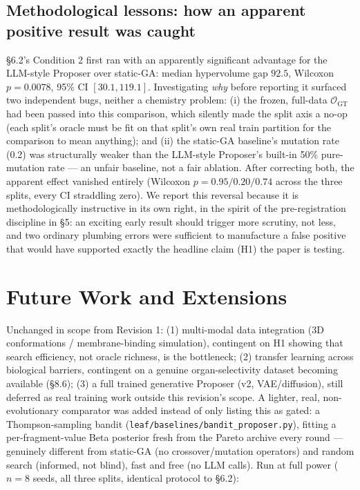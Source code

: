 \documentclass{article}
\begin{document}
\subsection{Methodological lessons: how an apparent positive result was
caught}

\S6.2's Condition 2 first ran with an apparently significant advantage for
the LLM-style Proposer over static-GA: median hypervolume gap $92.5$,
Wilcoxon $p=0.0078$, 95\% CI $[30.1, 119.1]$. Investigating \emph{why}
before reporting it surfaced two independent bugs, neither a chemistry
problem: (i) the frozen, full-data $\mathcal{O}_{\text{GT}}$ had been
passed into this comparison, which silently made the split axis a no-op
(each split's oracle must be fit on that split's own real train partition
for the comparison to mean anything); and (ii) the static-GA baseline's
mutation rate (0.2) was structurally weaker than the LLM-style Proposer's
built-in 50\% pure-mutation rate --- an unfair baseline, not a fair
ablation. After correcting both, the apparent effect vanished entirely
(Wilcoxon $p=0.95/0.20/0.74$ across the three splits, every CI straddling
zero). We report this reversal because it is methodologically instructive
in its own right, in the spirit of the pre-registration discipline in
\S5: an exciting early result should trigger more scrutiny, not less, and
two ordinary plumbing errors were sufficient to manufacture a false
positive that would have supported exactly the headline claim (H1) the
paper is testing.

\section{Future Work and Extensions}

Unchanged in scope from Revision 1: (1) multi-modal data integration (3D
conformations / membrane-binding simulation), contingent on H1 showing
that search efficiency, not oracle richness, is the bottleneck; (2)
transfer learning across biological barriers, contingent on a genuine
organ-selectivity dataset becoming available (\S8.6); (3) a full trained
generative Proposer (v2, VAE/diffusion), still deferred as real training
work outside this revision's scope. A lighter, real, non-evolutionary
comparator was added instead of only listing this as gated: a
Thompson-sampling bandit (\texttt{leaf/baselines/bandit\_proposer.py}),
fitting a per-fragment-value Beta posterior fresh from the Pareto archive
every round --- genuinely different from static-GA (no crossover/mutation
operators) and random search (informed, not blind), fast and free (no
LLM calls). Run at full power ($n=8$ seeds, all three splits, identical
protocol to \S6.2):
\end{document}
